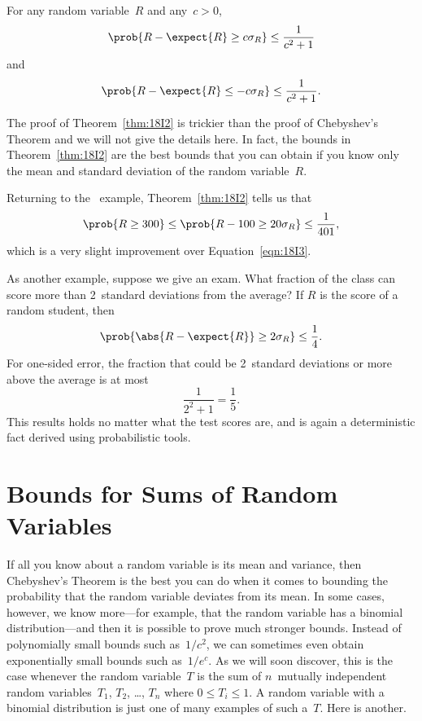 \begin{theorem}\label{thm:18I2}
For any random variable~$R$ and any~$c > 0$,
\begin{equation*}
    \prob{R - \expect{R} \ge c \sigma_R} \le \frac{1}{c^2 + 1}
\end{equation*}
and
\begin{equation*}
    \prob{R - \expect{R} \le -c \sigma_R} \le \frac{1}{c^2 + 1}.
\end{equation*}
\end{theorem}

The proof of Theorem~\ref{thm:18I2} is trickier than the proof of
Chebyshev's Theorem and we will not give the details here.  In fact,
the bounds in Theorem~\ref{thm:18I2} are the best bounds that you can
obtain if you know only the mean and standard deviation of the random
variable~$R$.

Returning to the \IQ\ example, Theorem~\ref{thm:18I2} tells us that
\begin{equation*}
    \prob{R \ge 300} \le \prob{R - 100 \ge 20 \sigma_R} \le \frac{1}{401},
\end{equation*}
which is a very slight improvement over Equation~\ref{eqn:18I3}.

As another example, suppose we give an exam.  What fraction of the
class can score more than 2~standard deviations from the average?  If
$R$ is the score of a random student, then
\begin{equation*}
    \prob{\abs{R - \expect{R}} \ge 2 \sigma_R} \le \frac{1}{4}.
\end{equation*}
For one-sided error, the fraction that could be 2~standard deviations
or more above the average is at most
\begin{equation*}
    \frac{1}{2^2 + 1} = \frac{1}{5}.
\end{equation*}
This results holds no matter what the test scores are, and is again a
deterministic fact derived using probabilistic tools.

\section{Bounds for Sums of Random Variables}

If all you know about a random variable is its mean and variance, then
Chebyshev's Theorem is the best you can do when it comes to bounding
the probability that the random variable deviates from its mean.  In
some cases, however, we know more---for example, that the random
variable has a binomial distribution---and then it is possible to
prove much stronger bounds.  Instead of polynomially small bounds such
as~$1/c^2$, we can sometimes even obtain exponentially small bounds
such as~$1/e^c$.  As we will soon discover, this is the case whenever
the random variable~$T$ is the sum of $n$~mutually independent random
variables~$T_1$, $T_2$, \dots, $T_n$ where $0 \le T_i \le 1$.  A
random variable with a binomial distribution is just one of many
examples of such a~$T$.  Here is another.

